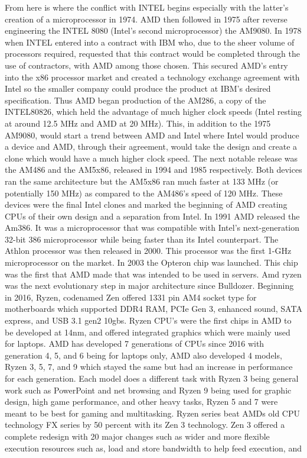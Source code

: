 \documentclass[../computer-history.tex]{subfiles}
\begin{document}
From here is where the conflict with INTEL begins especially with the latter’s creation of a microprocessor in 1974. AMD then followed in 1975 after reverse engineering the INTEL 8080 (Intel’s second microprocessor) the AM9080. In 1978 when INTEL entered into a contract with IBM who, due to the sheer volume of processors required, requested that this contract would be completed through the use of contractors, with AMD among those chosen. This secured AMD’s entry into the x86 processor market and created a technology exchange agreement with Intel so the smaller company could produce the product at IBM’s desired specification. Thus AMD began production of the AM286, a copy of the INTEL80826, which held the advantage of much higher clock speeds (Intel resting at around 12.5 MHz and AMD at 20 MHz). This, in addition to the 1975 AM9080, would start a trend between AMD and Intel where Intel would produce a device and AMD, through their agreement, would take the design and create a clone which would have a much higher clock speed. The next notable release was the AM486 and the AM5x86, released in 1994 and 1985 respectively. Both devices ran the same architecture but the AM5x86 ran much faster at 133 MHz (or potentially 150 MHz) as compared to the AM486’s speed of 120 MHz. These devices were the final Intel clones and marked the beginning of AMD creating CPUs of their own design and a separation from Intel.
In 1991 AMD released the Am386.\cite{Butlerwebsite} It was a microprocessor that was compatible with Intel's next-generation 32-bit 386 microprocessor while being faster than its Intel counterpart. The Athlon processor was then released in 2000. This processor was the first 1-GHz microprocessor on the market. In 2003 the Opteron chip was launched. This chip was the first that AMD made that was intended to be used in servers.\cite{Britannicawebsite}
\cite{Ryzen}Amd ryzen was the next evolutionary step in major architecture since Bulldozer. Beginning in 2016, Ryzen, codenamed Zen offered 1331 pin AM4 socket type for motherboards which supported DDR4 RAM, PCIe Gen 3, enhanced sound, SATA express, and USB 3.1 gen2 10gbs. Ryzen CPU's were the first chips in AMD to be developed at 14nm, and offered integrated graphics which were mainly used for laptops.\cite{Ryzen2} AMD has developed 7 generations of CPUs since 2016 with generation 4, 5, and 6 being for laptops only, AMD also developed 4 models, Ryzen 3, 5, 7, and 9 which stayed the same but had an increase in performance for each generation. Each model does a different task with Ryzen 3 being general work such as PowerPoint and net browsing and Ryzen 9 being used for graphic design, high game performance, and other heavy tasks, Ryzen 5 and 7 were meant to be best for gaming and multitasking.\cite{Ryzen3} Ryzen series beat AMDs old CPU technology FX series by 50 percent with its Zen 3 technology.\cite{Ryzen4} Zen 3 offered a complete redesign with 20 major changes such as wider and more flexible execution resources such as, load and store bandwidth to help feed execution, and 
\end{document}
